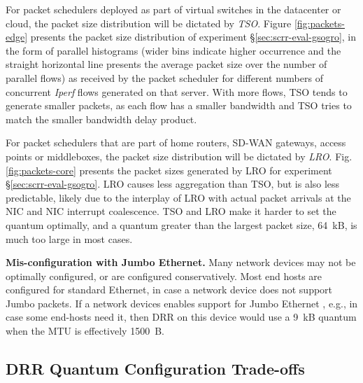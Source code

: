For packet schedulers deployed as part of virtual switches in the datacenter or cloud, the
packet size distribution will be dictated by
\textit{TSO}. Figure \ref{fig:packets-edge} presents the packet size
distribution of experiment \S\ref{sec:scrr-eval-gsogro}, in the form of
parallel histograms (wider bins indicate higher occurrence and the
straight horizontal line presents the average packet size over the
number of parallel flows) as received by the packet scheduler for
different numbers of concurrent \textit{Iperf} flows generated on that
server. With more flows, TSO tends to generate smaller packets, as
each flow has a smaller bandwidth and TSO tries to match the smaller
bandwidth delay product.


For packet schedulers that are part of home routers, SD-WAN gateways, access
points or middleboxes, the packet size distribution will be dictated
by \textit{LRO}. Fig. \ref{fig:packets-core} presents the packet sizes
generated by LRO for experiment \S\ref{sec:scrr-eval-gsogro}. LRO causes
less aggregation than TSO, but is also less predictable, likely due to the
interplay of LRO with actual packet arrivals at the NIC and NIC
interrupt coalescence. TSO and LRO make it harder to set the quantum
optimally, and a quantum greater than the largest packet size, 64~kB,
is much too large in most cases.


\textbf{Mis-configuration with Jumbo Ethernet.}  Many network devices
may not be optimally configured, or are configured
conservatively. Most end hosts are configured for standard Ethernet,
in case a network device does not support Jumbo packets. If a network
devices enables support for Jumbo Ethernet \cite{jumboixp}, e.g., in
case some end-hosts need it, then DRR on this device would use a 9~kB
quantum when the MTU is effectively 1500~B.


% 

\subsection{DRR Quantum Configuration Trade-offs}
\label{sec:drr-tradeoff}

